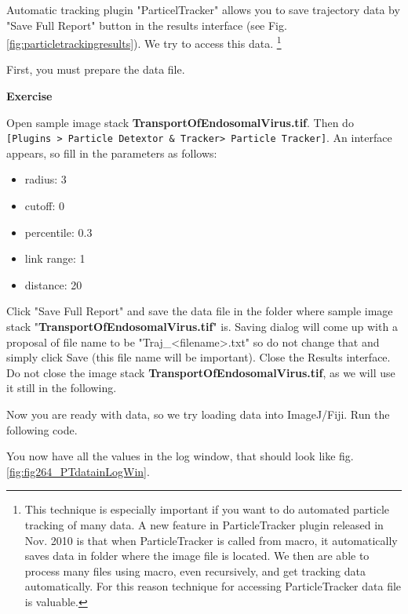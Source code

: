 \documentclass[11pt,a4paper,oneside]{report}
\newenvironment{indentexercise}[1]%
{{\setlength{\leftmargin}{2em}}%
\textbf{Exercise \thesubsection-#1}%
\begin{list}{}%
	\item%
}
{\end{list}}
\newcommand{\ijmenu}[1]{\texttt{\small#1}}
\begin{document}
Automatic tracking plugin "ParticelTracker" allows you to save trajectory data by "Save Full Report" 
button in the results interface (see Fig. \ref{fig:particletrackingresults}). 
We try to access this data. 
\footnote{ This technique is especially important if you want to do automated particle tracking of many data. 
A new feature in ParticleTracker plugin released in Nov. 2010 is that when ParticleTracker is called from macro, 
it automatically saves data in folder where the image file is located. We then are able to process many files using macro, 
even recursively, and get tracking data automatically. For this reason technique for accessing ParticleTracker data file is valuable.}

First, you must prepare the data file. 

\begin{indentexercise}{1}
\item Open sample image stack \textbf{TransportOfEndosomalVirus.tif}. 
Then do \ijmenu{[Plugins > Particle Detextor \& Tracker> Particle Tracker]}. 
An interface appears, so fill in the parameters as follows:
\begin{itemize}
\item radius: 3
\item cutoff: 0
\item percentile: 0.3
\item link range: 1
\item distance: 20
\end{itemize}
\item Click "Save Full Report" and save the data file in the folder where sample image stack 
"\textbf{TransportOfEndosomalVirus.tif}" is. 
Saving dialog will come up with a proposal of file name to be "Traj\_<filename>.txt" 
so do not change that and simply click Save (this file name will be important). 
Close the Results interface. Do not close the image stack \textbf{TransportOfEndosomalVirus.tif}, 
as we will use it still in the following.
\end{indentexercise}

Now you are ready with data, so we try loading data into ImageJ/Fiji. Run the following code. 



You now have all the values in the log window, that should look like fig. \ref{fig:fig264_PTdatainLogWin}. 
\end{document}
